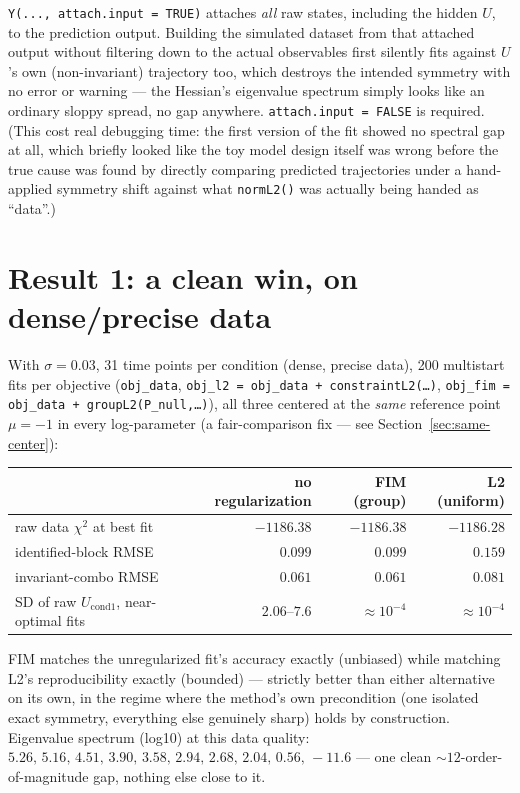 \documentclass[11pt]{article}
\newcommand{\code}[1]{\texttt{#1}}
\begin{document}
\code{Y(..., attach.input = TRUE)} attaches \emph{all} raw states, including
the hidden $U$, to the prediction output. Building the simulated dataset from
that attached output without filtering down to the actual observables first
silently fits against $U$'s own (non-invariant) trajectory too, which
destroys the intended symmetry with no error or warning --- the Hessian's
eigenvalue spectrum simply looks like an ordinary sloppy spread, no gap
anywhere. \code{attach.input = FALSE} is required. (This cost real debugging
time: the first version of the fit showed no spectral gap at all, which
briefly looked like the toy model design itself was wrong before the true
cause was found by directly comparing predicted trajectories under a
hand-applied symmetry shift against what \code{normL2()} was actually being
handed as ``data''.)

\section{Result 1: a clean win, on dense/precise data}
\label{sec:clean}

With $\sigma=0.03$, 31 time points per condition (dense, precise data), 200
multistart fits per objective (\code{obj\_data}, \code{obj\_l2 =
obj\_data + constraintL2(\ldots)}, \code{obj\_fim = obj\_data +
groupL2(P\_null,\ldots)}), all three centered at the \emph{same} reference
point $\mu=-1$ in every log-parameter (a fair-comparison fix --- see
Section~\ref{sec:same-center}):

\begin{center}
\begin{tabular}{lrrr}
\toprule
 & no regularization & FIM (group) & L2 (uniform) \\
\midrule
raw data $\chi^2$ at best fit & $-1186.38$ & $-1186.38$ & $-1186.28$ \\
identified-block RMSE & $0.099$ & $0.099$ & $0.159$ \\
invariant-combo RMSE & $0.061$ & $0.061$ & $0.081$ \\
SD of raw $U_{\text{cond1}}$, near-optimal fits & $2.06$--$7.6$ & $\approx 10^{-4}$ & $\approx 10^{-4}$ \\
\bottomrule
\end{tabular}
\end{center}

FIM matches the unregularized fit's accuracy exactly (unbiased) while
matching L2's reproducibility exactly (bounded) --- strictly better than
either alternative on its own, in the regime where the method's own
precondition (one isolated exact symmetry, everything else genuinely sharp)
holds by construction. Eigenvalue spectrum (log10) at this data quality:
$5.26,\,5.16,\,4.51,\,3.90,\,3.58,\,2.94,\,2.68,\,2.04,\,0.56,\,-11.6$ --- one
clean $\sim\!12$-order-of-magnitude gap, nothing else close to it.
\end{document}
